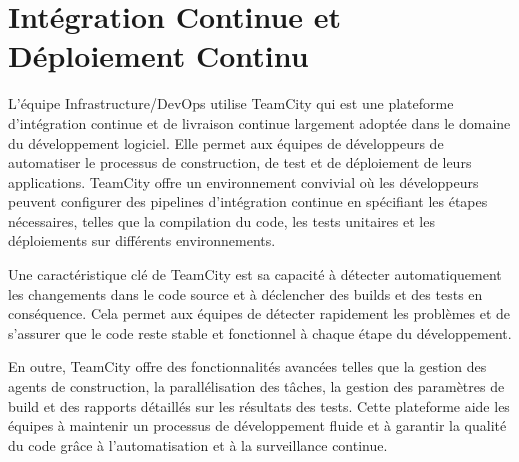 \section{Intégration Continue et Déploiement Continu}\label{sec:ci-cd}

L'équipe Infrastructure/DevOps utilise TeamCity qui est une plateforme d'intégration continue et de livraison continue largement adoptée dans le domaine du développement logiciel. Elle permet aux équipes de développeurs de automatiser le processus de construction, de test et de déploiement de leurs applications. TeamCity offre un environnement convivial où les développeurs peuvent configurer des pipelines d'intégration continue en spécifiant les étapes nécessaires, telles que la compilation du code, les tests unitaires et les déploiements sur différents environnements.

Une caractéristique clé de TeamCity est sa capacité à détecter automatiquement les changements dans le code source et à déclencher des builds et des tests en conséquence. Cela permet aux équipes de détecter rapidement les problèmes et de s'assurer que le code reste stable et fonctionnel à chaque étape du développement.

En outre, TeamCity offre des fonctionnalités avancées telles que la gestion des agents de construction, la parallélisation des tâches, la gestion des paramètres de build et des rapports détaillés sur les résultats des tests. Cette plateforme aide les équipes à maintenir un processus de développement fluide et à garantir la qualité du code grâce à l'automatisation et à la surveillance continue.